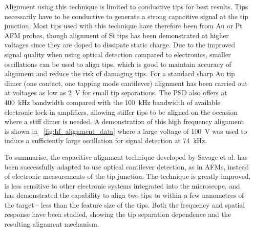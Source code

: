 \documentclass{article}
\begin{document}
Alignment using this technique is limited to conductive tips for best results. Tips necessarily have to be conductive to generate a strong capacitive signal at the tip junction. Most tips used with this technique have therefore been from Au or Pt AFM probes, though alignment of Si tips has been demonstrated at higher voltages since they are doped to dissipate static charge. Due to the improved signal quality when using optical detection compared to electronics, smaller oscillations can be used to align tips, which is good to maintain accuracy of alignment and reduce the risk of damaging tips. For a standard sharp Au tip dimer (one contact, one tapping mode cantilever) alignment has been carried out at voltages as low as \SI{2}{V} for small tip separations. The PSD also offers at \SI{400}{kHz} bandwidth compared with the \SI{100}{kHz} bandwidth of available electronic lock-in amplifiers, allowing stiffer tips to be aligned on the occasion where a stiff dimer is needed. A demonstration of this high frequency alignment is shown in \figurename~\ref{fig:hf_alignment_data} where a large voltage of \SI{100}{V} was used to induce a sufficiently large oscillation for signal detection at \SI{74}{kHz}.

To summarise, the capacitive alignment technique developed by Savage et al. \cite{savage2011} has been successfully adapted to use optical cantilever detection, as in AFMs, instead of electronic measurements of the tip junction. The technique is greatly improved, is less sensitive to other electronic systems integrated into the microscope, and has demonstrated the capability to align two tips to within a few nanometres of the target - less than the feature size of the tips. Both the frequency and spatial response have been studied, showing the tip separation dependence and the resulting alignment mechanism.
\end{document}
